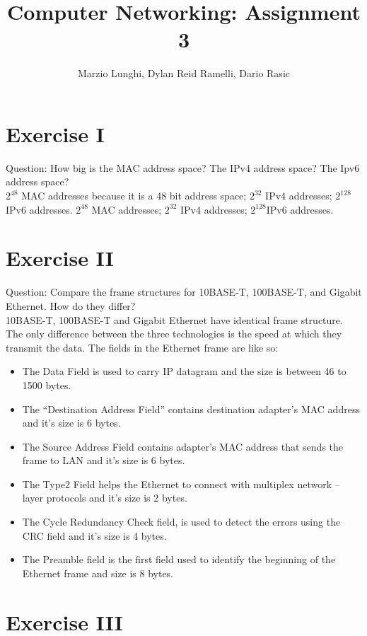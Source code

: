 \documentclass[11pt]{article}
\title{Computer Networking: Assignment 3}
\author{Marzio Lunghi, Dylan Reid Ramelli, Dario Rasic}
\begin{document}
	\maketitle
	\newpage
	\section*{Exercise I}
	Question: How big is the MAC address space? The IPv4 address space? The Ipv6 address space?\\
	$2^{48}$ MAC addresses because it is a 48 bit address space; $2^{32}$ IPv4 addresses; $2^{128}$IPv6 addresses.
	\linebreak
	$2^{48}$ MAC addresses; $2^{32}$ IPv4 addresses; $2^{128}$IPv6 addresses.
	\section*{Exercise II}
	Question: Compare the frame structures for 10BASE-T, 100BASE-T,
	and Gigabit Ethernet. How do they differ?\\
	\linebreak
	10BASE-T, 100BASE-T and Gigabit Ethernet have identical frame structure.
	The only difference between the three technologies is the speed at which they transmit the data.
	The fields in the Ethernet frame are like so:
	\begin{itemize}
		\item The Data Field is used to carry IP datagram and the size is between 46 to 1500 bytes.
		\item 	The “Destination Address Field” contains destination adapter’s MAC address and it's size is 6 bytes.
		\item 	The Source Address Field contains adapter’s MAC address that sends the frame to LAN and it's size is 6 bytes.
		\item 	The Type2 Field helps the Ethernet to connect with multiplex network – layer protocols and it's size is 2 bytes.
		\item The Cycle Redundancy Check field, is used to detect the errors using the CRC field and it's size is 4 bytes.
		\item 	The Preamble field is the first field used to identify the beginning of the Ethernet frame and size is 8 bytes.
	\end{itemize}

	\section*{Exercise III}
\end{document}
